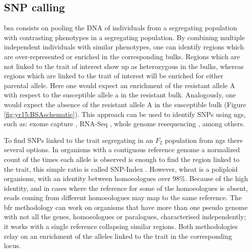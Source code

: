 \subsection{SNP calling}
\gls{bsa} consists on pooling the DNA of individuals from a segregating population with contrasting phenotypes \citep{Michelmore1991} in a segregating population. 
By combining multiple independent individuals with similar phenotypes, one can identify regions which are over-represented or enriched in the corresponding bulks. 
Regions which are not linked to the trait of interest show up as heterozygous in the bulks, whereas regions which are linked to the trait of interest will be enriched for either parental allele.
Here one would expect an enrichment of the resistant allele A with respect to the susceptible allele a in the resistant bulk. 
Analogously, one would expect the absence of the resistant allele A in the susceptible bulk (Figure \ref{fig:yr15:BSAschematic}). 
This approach can be used to identify SNPs using \gls{ngs}, such as: exome capture \citep{Hodges2007}, RNA-Seq \citep{Pickrell2010}, whole genome resequencing \citep{Schneeberger2009}, among others. 

To find SNPs linked to the trait segregating in an $F_{2}$ population from \gls{ngs} there several options. 
In organisms with a contiguous reference genome a normalized count of the times each allele is observed is enough to find the region linked to the trait, this simple ratio is called SNP-Index \citep{Takagi2013a}.
However, wheat is a poliploid organisms, with an identity between homoeologues over 98\%. 
Because of the high identity, and in cases where the reference for some of the homoeologues is absent, reads coming from different homoeologues may map to the same reference. 
The \gls{bfr} \citep{Trick2012} methodology can work on organisms that have more than one pseudo genome with not all the genes, homoeologues or paralogues, characterised independently; it works with a single reference collapsing similar regions. 
Both methodologies relay on an enrichment of the alleles linked to the trait in the corresponding locus. 


